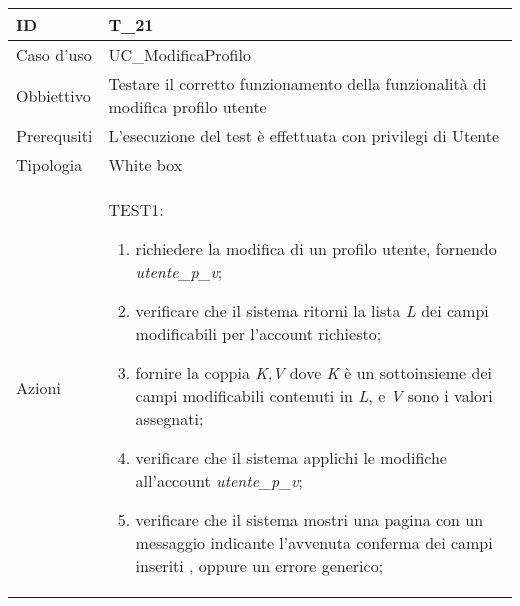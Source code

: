 \begin{table}[hb]
    \centering
    \begin{tabular}{ |p{2cm}|p{10cm}|  }
        \hline
        ID          & T\_21                                                                           \\\hline
        Caso d'uso  & UC\_ModificaProfilo                                                             \\\hline
        Obbiettivo  & Testare il corretto funzionamento della funzionalità di modifica profilo utente \\\hline
        Prerequsiti & L'esecuzione del test è effettuata con privilegi di Utente                      \\\hline
        Tipologia   & White box                                                                       \\\hline
        Azioni      &
        TEST1:
        \begin{enumerate}[nosep, topsep=0pt]
            \item richiedere la modifica di un profilo utente, fornendo \emph{utente\_p\_v};
            \item verificare che il sistema ritorni la lista \emph{L} dei campi modificabili per l'account richiesto;
            \item fornire la coppia \emph{K,V} dove \emph{K} è un sottoinsieme dei campi modificabili contenuti in \emph{L}, e \emph{V} sono i valori assegnati;
            \item verificare che il sistema applichi le modifiche all'account \emph{utente\_p\_v};
            \item verificare che il sistema mostri una pagina con un messaggio indicante l'avvenuta conferma dei campi inseriti , oppure un errore generico;
        \end{enumerate}
        \\\hline
    \end{tabular}
\end{table}

